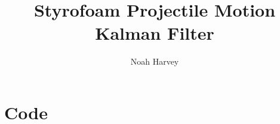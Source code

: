 \documentclass{report}
\begin{document}
\title{Styrofoam Projectile Motion Kalman Filter}
\author{Noah Harvey}
\maketitle
\chapter*{Code}

\end{document}
